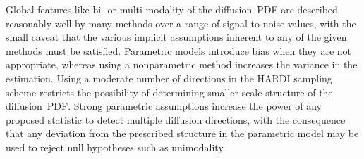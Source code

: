 \documentclass[dvips,aoas,preprint]{imsart}
\numberwithin{equation}{section}
\theoremstyle{plain}
\begin{document}


Global features like bi- or multi-modality of the diffusion~PDF are
described reasonably well by many methods over a range of
signal-to-noise values, with the small caveat that the various
implicit assumptions inherent to any of the given methods must be
satisfied.  Parametric models introduce bias when they are not
appropriate, whereas using a nonparametric method increases the
variance in the estimation.  Using a moderate number of directions in
the HARDI sampling scheme restricts the possibility of determining
smaller scale structure of the diffusion~PDF.  Strong parametric
assumptions increase the power of any proposed statistic to detect
multiple diffusion directions, with the consequence that any deviation
from the prescribed structure in the parametric model may be used to
reject null hypotheses such as unimodality.

\end{document}
